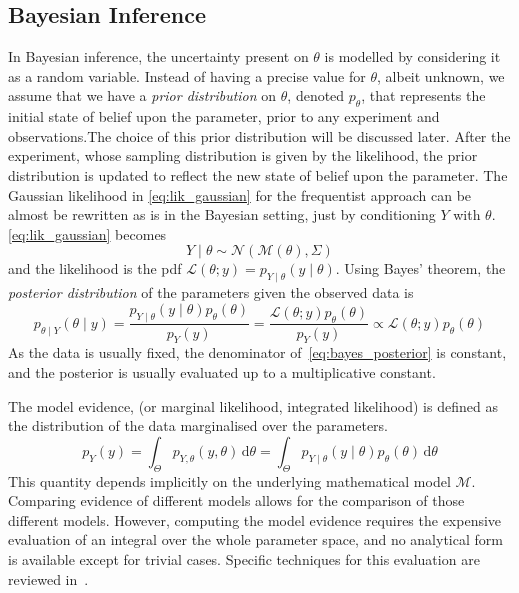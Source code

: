 \documentclass[../../Main_ManuscritThese.tex]{subfiles}
\begin{document}
\subsection{Bayesian Inference}
\label{sec:bayesian_inference_MAP}
In Bayesian inference, the uncertainty present on $\theta$ is modelled by considering it as a random variable. Instead of having a precise value for $\theta$, albeit unknown, we assume that we have a \emph{prior distribution} on $\theta$, denoted $p_{\theta}$, that represents the initial state of belief upon the parameter, prior to any experiment and observations.The choice of this prior distribution will be discussed later.
After the experiment, whose sampling distribution is given by the likelihood, the prior distribution is updated to reflect the new state of belief upon the parameter. 
The Gaussian likelihood in \cref{eq:lik_gaussian} for the frequentist approach can be almost be rewritten as is in the Bayesian setting, just by conditioning $Y$ with $\theta$.
\cref{eq:lik_gaussian} becomes
\begin{equation}
  Y \mid  \theta \sim \mathcal{N}(\mathcal{M}(\theta), \Sigma)
\end{equation}
and the likelihood is the pdf $\mathcal{L}(\theta;y) = p_{Y\mid \theta}(y \mid  \theta)$.
Using Bayes' theorem, the \emph{posterior distribution} of the parameters given the observed data is
\begin{equation}
  \label{eq:bayes_posterior}
  p_{\theta \mid Y}(\theta \mid y) = \frac{p_{Y\mid \theta}(y \mid  \theta)p_{\theta}(\theta)}{p_Y(y)} = \frac{\mathcal{L}(\theta;y)p_{\theta}(\theta)}{p_Y(y)} \propto \mathcal{L}(\theta;y)p_{\theta}(\theta)
\end{equation}
As the data is usually fixed, the denominator of~\eqref{eq:bayes_posterior} is constant, and the posterior is usually evaluated up to a multiplicative constant.


\begin{definition}  
  The model evidence, (or marginal likelihood, integrated likelihood) is defined as the distribution of the data marginalised over the parameters.
  \begin{equation}
    \label{eq:model_evidence}
    p_Y(y) = \int_{\Theta}p_{Y,\theta}(y,\theta)\,\mathrm{d}\theta = \int_{\Theta}p_{Y \mid \theta}(y \mid \theta)p_{\theta}(\theta)\,\mathrm{d}\theta
  \end{equation}
  This quantity depends implicitly on the underlying mathematical model $\mathcal{M}$. Comparing evidence of different models allows for the comparison of those different models. However, computing the model evidence requires the expensive evaluation of an integral over the whole parameter space, and no analytical form is available except for trivial cases. Specific techniques for this evaluation are reviewed in~\cite{friel_estimating_2011}.
\end{definition}
\end{document}
